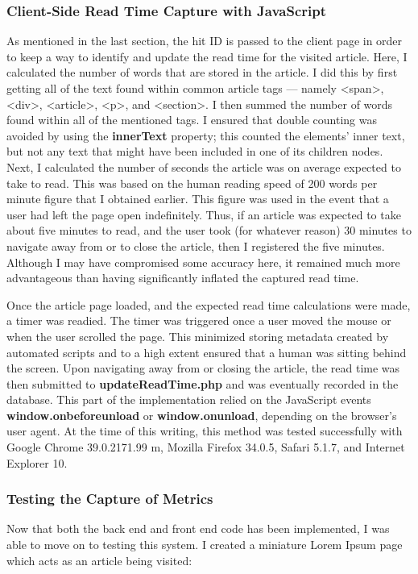 \documentclass[12pt]{article}
\begin{document}
{\subsubsection{Client-Side Read Time Capture with JavaScript} 
As mentioned in the last section, the hit ID is passed to the client page in order to keep a way to identify and update the read time for the visited article. Here, I calculated the number of words that are stored in the article. I did this by first getting all of the text found within common article tags --- namely <span>, <div>, <article>, <p>, and <section>. I then summed the number of words found within all of the mentioned tags. I ensured that double counting was avoided by using the \textbf{innerText} property; this counted the elements' inner text, but not any text that might have been included in one of its children nodes. Next, I calculated the number of seconds the article was on average expected to take to read. This was based on the human reading speed of 200 words per minute figure that I obtained earlier. This figure was used in the event that a user had left the page open indefinitely. Thus, if an article was expected to take about five minutes to read, and the user took (for whatever reason) 30 minutes to navigate away from or to close the article, then I registered the five minutes. Although I may have compromised some accuracy here, it remained much more advantageous than having significantly inflated the captured read time.

Once the article page loaded, and the expected read time calculations were made, a timer was readied. The timer was triggered once a user moved the mouse or when the user scrolled the page. This minimized storing metadata created by automated scripts and to a high extent ensured that a human was sitting behind the screen. Upon navigating away from or closing the article, the read time was then submitted to \textbf{updateReadTime.php} and was eventually recorded in the database. This part of the implementation relied on the JavaScript events \textbf{window.onbeforeunload} or \textbf{window.onunload}, depending on the browser's user agent. At the time of this writing, this method was tested successfully with Google Chrome 39.0.2171.99 m, Mozilla Firefox 34.0.5, Safari 5.1.7, and Internet Explorer 10.
 
\newpage

\subsubsection{Testing the Capture of Metrics}
Now that both the back end and front end code has been implemented, I was able to move on to testing this system. I created a miniature Lorem Ipsum page which acts as an article being visited: \\

}
\end{document}
